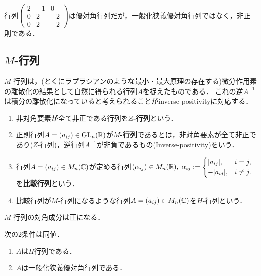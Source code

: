 \documentclass[uplatex, dvipdfmx]{jsreport}
\begin{document}
\begin{example}
    行列$\begin{pmatrix}2&-1&0\\0&2&-2\\0&2&-2\end{pmatrix}$は優対角行列だが，一般化狭義優対角行列ではなく，非正則である．
\end{example}

\subsection{$M$-行列}

\begin{tcolorbox}[colframe=ForestGreen, colback=ForestGreen!10!white,breakable,colbacktitle=ForestGreen!40!white,coltitle=black,fonttitle=\bfseries\sffamily,
title=]
    $M$-行列は，(とくにラプラシアンのような最小・最大原理の存在する)微分作用素の離散化の結果として自然に得られる行列$A$を捉えたものである．
    これの逆$A^{-1}$は積分の離散化になっていると考えられることがinverse positivityに対応する．
\end{tcolorbox}

\begin{definition}\mbox{}
    \begin{enumerate}
        \item 非対角要素が全て非正である行列を\textbf{$Z$-行列}という．
        \item 正則行列$A=(a_{ij})\in\mathrm{GL}_n(\mathbb{R})$が\textbf{$M$-行列}であるとは，非対角要素が全て非正であり($Z$-行列)，逆行列$A^{-1}$が非負であるもの(Inverse-positivity)をいう．
        \item 行列$A=(a_{ij})\in M_n(\mathbb{C})$が定める行列$(\alpha_{ij})\in M_n(\mathbb{R}),\;\alpha_{ij}:=\begin{cases}
            \lvert a_{ij}\rvert,&i=j,\\
            -\lvert a_{ij}\rvert,&i\ne j.
        \end{cases}$を\textbf{比較行列}という．
        \item 比較行列が$M$-行列になるような行列$A=(a_{ij})\in M_n(\mathbb{C})$を$H$-行列という．
    \end{enumerate}
\end{definition}

\begin{lemma}
    $M$-行列の対角成分は正になる．
\end{lemma}

\begin{lemma}
    次の2条件は同値．
    \begin{enumerate}
        \item $A$は$H$行列である．
        \item $A$は一般化狭義優対角行列である．
    \end{enumerate}
\end{lemma}
\end{document}
